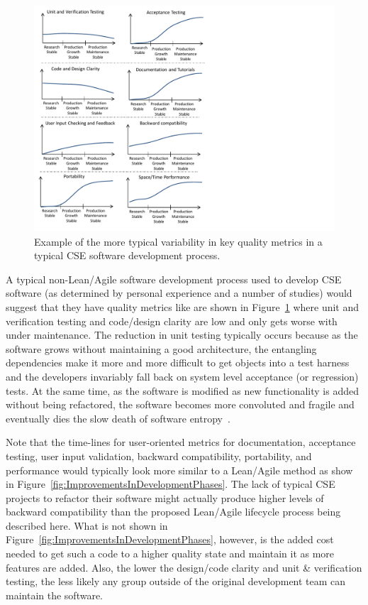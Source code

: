 \documentclass[11pt]{SANDreport}
\begin{document}
\begin{figure}
\begin{center}
\includegraphics[trim = 0.1in 0.1in 4.0in 0.1in, scale=0.85]
{TypicalNonAgileSoftwarePhases}
{}\caption{Example of the more typical variability in key quality
metrics in a typical CSE software development process.}
\label{fig:TypicalNonAgileSoftwarePhases}
\end{center}
\end{figure}

A typical non-Lean/Agile software development process used to develop
CSE software (as determined by personal experience and a number of
studies) would suggest that they have quality metrics like are shown
in Figure~\ref{fig:TypicalNonAgileSoftwarePhases} where unit and
verification testing and code/design clarity are low and only gets
worse with under maintenance.  The reduction in unit testing typically
occurs because as the software grows without maintaining a good
architecture, the entangling dependencies make it more and more
difficult to get objects into a test harness and the developers
invariably fall back on system level acceptance (or regression) tests.
At the same time, as the software is modified as new functionality is
added without being refactored, the software becomes more convoluted
and fragile and eventually dies the slow death of software
entropy~\cite{MythicalManMonth95}.

Note that the time-lines for user-oriented metrics for documentation,
acceptance testing, user input validation, backward compatibility,
portability, and performance would typically look more similar to a
Lean/Agile method as show in
Figure~\ref{fig:ImprovementsInDevelopmentPhases}.  The lack of typical
CSE projects to refactor their software might actually produce higher
levels of backward compatibility than the proposed Lean/Agile
lifecycle process being described here.  What is not shown in
Figure~\ref{fig:ImprovementsInDevelopmentPhases}, however, is the
added cost needed to get such a code to a higher quality state and
maintain it as more features are added.  Also, the lower the
design/code clarity and unit \& verification testing, the less likely
any group outside of the original development team can maintain the
software.
\end{document}
